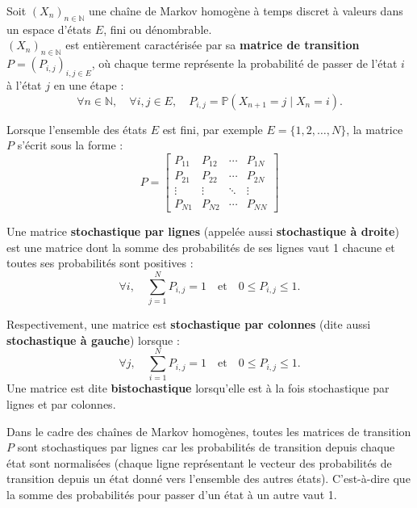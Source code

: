 \documentclass{article}
\begin{document}
\begin{tcolorbox}[colback=white,colframe=red!80!black,title=Matrice de Transition]
Soit $(X_n)_{n \in \mathbb{N}}$ une chaîne de Markov homogène à temps discret à valeurs dans un espace d'états $E$, fini ou dénombrable. \\

$(X_n)_{n \in \mathbb{N}}$ est entièrement caractérisée par sa \textbf{matrice de transition} $P = (P_{i,j})_{i,j \in E}$, où chaque terme représente la probabilité de passer de l'état $i$ à l'état $j$ en une étape :
\[
\forall n \in \mathbb{N}, \quad \forall i,j \in E, \quad P_{i,j} = \mathbb{P}(X_{n+1} = j \mid X_n = i).
\]

Lorsque l'ensemble des états $E$ est fini, par exemple $E = \{1, 2, \dots, N\}$, la matrice $P$ s'écrit sous la forme :
\[
    P = \begin{bmatrix}
        P_{11} & P_{12} & \cdots & P_{1N}\\[1mm]
        P_{21} & P_{22} & \cdots & P_{2N}\\[1mm]
        \vdots & \vdots & \ddots & \vdots\\[1mm]
        P_{N1} & P_{N2} & \cdots & P_{NN}
    \end{bmatrix}
\]
\end{tcolorbox}

\begin{tcolorbox}[colback=white,colframe=blue!80!black,title=Matrice stochastique par lignes/colonnes]
Une matrice \textbf{stochastique par lignes} (appelée aussi \textbf{stochastique à droite}) est une matrice dont la somme des probabilités de ses lignes vaut 1 chacune et toutes ses probabilités sont positives :
\[
\forall i, \quad \sum_{j=1}^{N} P_{i,j} = 1 \quad \text{et} \quad 0 \leq P_{i,j} \leq 1.
\]

Respectivement, une matrice est \textbf{stochastique par colonnes} (dite aussi \textbf{stochastique à gauche}) lorsque :
\[
\forall j, \quad \sum_{i=1}^{N} P_{i,j} = 1 \quad \text{et} \quad 0 \leq P_{i,j} \leq 1.
\]
Une matrice est dite \textbf{bistochastique} lorsqu'elle est à la fois stochastique par lignes et par colonnes.
\end{tcolorbox}

Dans le cadre des chaînes de Markov homogènes, toutes les matrices de transition $P$ sont stochastiques par lignes car les probabilités de transition depuis chaque état sont normalisées (chaque ligne représentant le vecteur des probabilités de transition depuis un état donné vers l'ensemble des autres états). C'est-à-dire que la somme des probabilités pour passer d'un état à un autre vaut 1. \\
\end{document}
